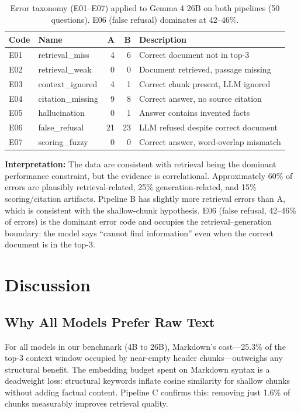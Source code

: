 \documentclass{article}
\begin{document}
\begin{table}[t]
    \centering
    \caption{Error taxonomy (E01--E07) applied to Gemma 4 26B on both pipelines (50 questions). E06 (false refusal) dominates at 42--46\%.}
    \label{tab:errors}
    \begin{tabular}{llrrl}
        \toprule
        Code & Name & A & B & Description \\
        \midrule
        E01 & retrieval\_miss   & 4  & 6  & Correct document not in top-3 \\
        E02 & retrieval\_weak   & 0  & 0  & Document retrieved, passage missing \\
        E03 & context\_ignored  & 4  & 1  & Correct chunk present, LLM ignored \\
        E04 & citation\_missing & 9  & 8  & Correct answer, no source citation \\
        E05 & hallucination    & 0  & 1  & Answer contains invented facts \\
        E06 & false\_refusal    & 21 & 23 & LLM refused despite correct document \\
        E07 & scoring\_fuzzy    & 0  & 0  & Correct answer, word-overlap mismatch \\
        \bottomrule
    \end{tabular}
\end{table}

\textbf{Interpretation:} The data are consistent with retrieval being the dominant performance constraint, but the evidence is correlational. Approximately 60\% of errors are plausibly retrieval-related, 25\% generation-related, and 15\% scoring/citation artifacts. Pipeline B has slightly more retrieval errors than A, which is consistent with the shallow-chunk hypothesis. E06 (false refusal, 42--46\% of errors) is the dominant error code and occupies the retrieval--generation boundary: the model says ``cannot find information'' even when the correct document is in the top-3.

\section{Discussion}

\subsection{Why All Models Prefer Raw Text}

For all models in our benchmark (4B to 26B), Markdown's cost---25.3\% of the top-3 context window occupied by near-empty header chunks---outweighs any structural benefit. The embedding budget spent on Markdown syntax is a deadweight loss: structural keywords inflate cosine similarity for shallow chunks without adding factual content. Pipeline C confirms this: removing just 1.6\% of chunks measurably improves retrieval quality.
\end{document}
